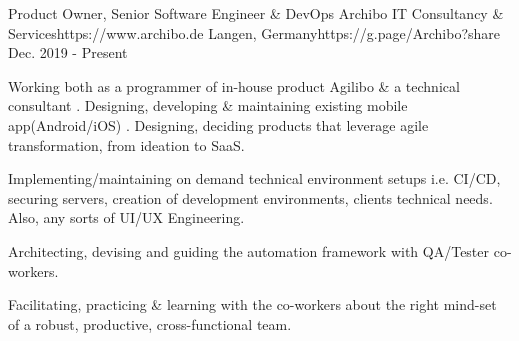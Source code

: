 

\begin{workentries}

\workentry
{Product Owner, Senior Software Engineer \& DevOps} %
{Archibo IT Consultancy \& Services}{https://www.archibo.de} %
{Langen, Germany}{https://g.page/Archibo?share} %
{Dec. 2019 - Present} %
    {
      \begin{workitems} %
        \item {Working both as a programmer of in-house product Agilibo \& a technical consultant
        . Designing, developing \& maintaining existing mobile app(Android/iOS)
        . Designing, deciding products that leverage agile transformation, from ideation to SaaS.}
        \item {Implementing/maintaining on demand technical environment setups i.e. CI/CD, securing servers, creation of development environments,
        clients technical needs. Also, any sorts of UI/UX Engineering.}
        \item {Architecting, devising and guiding the automation framework with QA/Tester co-workers.}
        \item {Facilitating, practicing \& learning with the co-workers about the right mind-set of a robust, productive, cross-functional team.}
      \end{workitems}
    }


\end{workentries}
